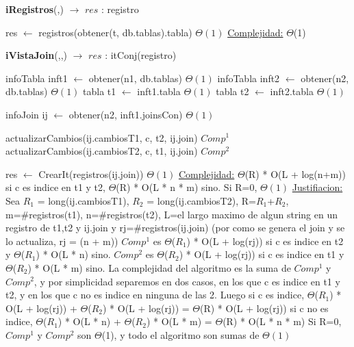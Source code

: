 \begin{algorithm}[H]{\textbf{iRegistros}(,) $\to$ $res$ : registro }
    	\begin{algorithmic}[1]
    		\State res $\gets$ registros(obtener(t, db.tablas).tabla)   \Comment $\Theta(1)$
			\medskip
			\Statex \underline{Complejidad:} $\Theta$(1) 
    	\end{algorithmic}
\end{algorithm}

\begin{algorithm}[H]{\textbf{iVistaJoin}(,,) $\to$ $res$ : itConj(registro) }
    	\begin{algorithmic}[1]
    	   	\State infoTabla inft1 $\gets$ obtener(n1, db.tablas)     \Comment $\Theta(1)$
    	   	\State infoTabla inft2 $\gets$ obtener(n2, db.tablas)     \Comment $\Theta(1)$
    		\State tabla t1 $\gets$ inft1.tabla         \Comment $\Theta(1)$
    		\State tabla t2 $\gets$ inft2.tabla         \Comment $\Theta(1)$

			\State infoJoin ij $\gets$ obtener(n2, inft1.joinsCon)     \Comment $\Theta(1)$

			\State actualizarCambios(ij.cambiosT1, c, t2, ij.join) 	\Comment $Comp^{1}$
			\State actualizarCambios(ij.cambiosT2, c, t1, ij.join) 	\Comment $Comp^{2}$
			
    		\State res $\gets$ CrearIt(registros(ij.join))                   \Comment $\Theta(1)$
			\medskip
			\Statex \underline{Complejidad:} $\Theta$(R) * O(L + log(n+m)) si c es indice en t1 y t2, $\Theta$(R) * O(L * n * m) sino. Si R=0, $\Theta(1)$
			\Statex \underline{Justifiacion:}  Sea $R_{1}$ = long(ij.cambiosT1), $R_{2}$ = long(ij.cambiosT2), R=$R_{1}$+$R_{2}$,  m=\#registros(t1),  n=\#registros(t2), L=el largo maximo de algun string en un registro de t1,t2 y ij.join y rj=\#registros(ij.join) (por como se genera el join y se lo actualiza, rj = (n + m))
		\Statex $Comp^{1}$ es $\Theta$($R_{1}$) * O(L + log(rj)) si c es indice en t2 y $\Theta$($R_{1}$) * O(L * n) sino.
		\Statex $Comp^{2}$ es $\Theta$($R_{2}$) * O(L + log(rj)) si c es indice en t1 y $\Theta$($R_{2}$) * O(L * m) sino.	
		\Statex La complejidad del algoritmo es la suma de $Comp^{1}$ y $Comp^{2}$, y por simplicidad separemos en dos casos, en los que c es indice en t1 y t2, y en los que c no es indice en ninguna de las 2.
		\Statex Luego si c es indice, $\Theta$($R_{1}$) * O(L + log(rj)) + $\Theta$($R_{2}$) * O(L + log(rj)) = $\Theta$(R) * O(L + log(rj))
		\Statex si c no es indice, $\Theta$($R_{1}$) * O(L * n) + $\Theta$($R_{2}$) * O(L * m) = $\Theta$(R) * O(L * n * m)
		\Statex Si R=0, $Comp^{1}$ y $Comp^{2}$ son $\Theta$(1), y todo el algoritmo son sumas de $\Theta(1)$
    	\end{algorithmic}
\end{algorithm}



